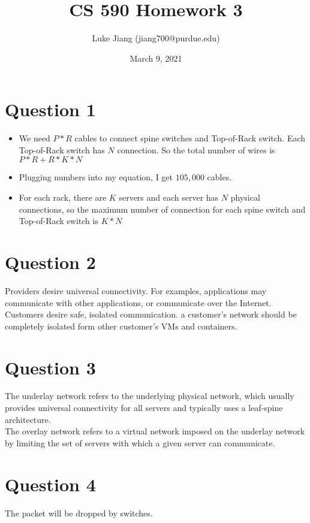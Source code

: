 \documentclass{article}
\title{CS 590 Homework 3}
\author{Luke Jiang (jiang700@purdue.edu) }
\date{March 9, 2021}
\begin{document}
\maketitle

\section{Question 1}
\begin{itemize}
    \item We need $P * R$ cables to connect spine switches and Top-of-Rack switch. Each Top-of-Rack switch has $N$ connection. So the total number of wires is $P * R + R * K * N$
    \item Plugging numbers into my equation, I get $105,000$ cables.
    \item For each rack, there are 
    $K$ servers and each server has $N$ physical connections, so the maximum number of connection for each spine switch and Top-of-Rack switch is $K * N$
\end{itemize}

\section{Question 2}
Providers desire universal connectivity. For examples, applications may communicate with other applications, or communicate over the Internet. Customers desire safe, isolated communication. a customer's network should be completely isolated form other customer's VMs and containers.

\section{Question 3}
The underlay network refers to the underlying physical network, which usually provides universal connectivity for all servers and typically uses a leaf-spine architecture. \\
The overlay network refers to a virtual network imposed on the underlay network by limiting the set of servers with which a given server can communicate.

\section{Question 4}
The packet will be dropped by switches.
\end{document}
